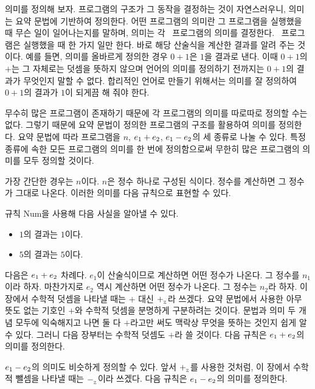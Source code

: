  의미를 정의해 보자. 프로그램의 구조가 그 동작을 결정하는 것이
자연스러우니, 의미는 요약 문법에 기반하여 정의한다. 어떤 프로그램의 의미란 그
프로그램을 실행했을 때 무슨 일이 일어나는지를 말하며,  의미는 각
\Lang~프로그램의 의미를 결정한다. \Lang~프로그램은 실행했을 때 한 가지 일만
한다. 바로 해당 산술식을 계산한 결과를 알려 주는 것이다. 예를 들면, 의미를
올바르게 정의한 경우 $0+1$은 $1$을 결과로 낸다. 이때 $0+1$의 $+$는 그 자체로는
덧셈을 뜻하지 않으며 언어의 의미를 정의하기 전까지는 $0+1$의 결과가 무엇인지
말할 수 없다.  합리적인 언어로 만들기 위해서는 의미를 잘 정의하여 $0+1$의
결과가 $1$이 되게끔 해 줘야 한다.

무수히 많은 프로그램이 존재하기 때문에 각 프로그램의 의미를 따로따로 정의할 수는
없다. 그렇기 때문에 요약 문법이 정의한 프로그램의 구조를 활용하여 의미를
정의한다. 요약 문법에 따라 프로그램을 $n$, $e_1+e_2$,
$e_1-e_2$의 세 종류로 나눌 수 있다. 특정 종류에 속한 모든 프로그램의
의미를 한 번에 정의함으로써 무한히 많은 프로그램의 의미를 모두 정의할 것이다.

가장 간단한 경우는 $n$이다. $n$은 정수 하나로 구성된 식이다. 정수를 계산하면 그
정수가 그대로 나온다. 이러한 의미를 다음 규칙으로 표현할 수 있다.


규칙 Num을 사용해 다음 사실을 알아낼 수 있다.

\begin{itemize}
  \item $1$의 결과는 $1$이다.
  \item $5$의 결과는 $5$이다.
\end{itemize}

다음은 $e_1+e_2$ 차례다. $e_1$이 산술식이므로 계산하면 어떤 정수가
나온다. 그 정수를 $n_1$이라 하자. 마찬가지로 $e_2$ 역시 계산하면 어떤 정수가
나온다. 그 정수는 $n_2$라 하자. 이 장에서 수학적 덧셈을 나타낼 때는 $+$ 대신
$+_{{}_{\mathbb{Z}}}$라 쓰겠다. 요약 문법에서 사용한 아무 뜻도 없는 기호인 $+$와 수학적 덧셈을
분명하게 구분하려는 것이다. 문법과 의미 두 개념 모두에 익숙해지고 나면 둘 다
$+$라고만 써도 맥락상 무엇을 뜻하는 것인지 쉽게 알 수 있다. 그러니 다음 장부터는
수학적 덧셈도 $+$라 쓸 것이다. 다음 규칙은 $e_1+e_2$의 의미를 정의한다.


$e_1-e_2$의 의미도 비슷하게 정의할 수 있다. 앞서 $+_{{}_{\mathbb{Z}}}$를 사용한
것처럼, 이 장에서 수학적 뺄셈을 나타낼 때는 $-_{{}_{\mathbb{Z}}}$이라 쓰겠다. 다음 규칙은
$e_1-e_2$의 의미를 정의한다.

